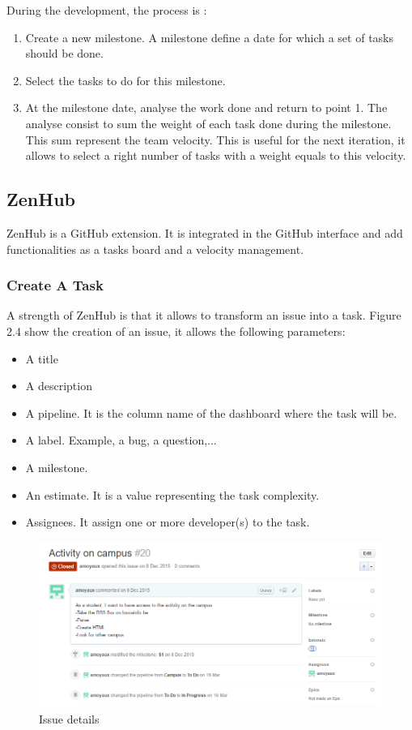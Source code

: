 \documentclass{eplmastersthesis}
\begin{document}
During the development, the process is :

\begin{enumerate}
\item Create a new milestone. A milestone define a date for which a set of tasks should be done.
\item Select the tasks to do for this milestone. 
\item At the milestone date, analyse the work done and return to point 1. The analyse consist to sum the weight of each task done during the milestone. This sum represent the team velocity. This is useful for the next iteration, it allows to select a right number of tasks with a weight equals to this velocity.
\end{enumerate}

\subsection{ZenHub}
ZenHub is a GitHub extension. It is integrated in the GitHub interface and add functionalities as a tasks board and a velocity management.  

\subsubsection{Create A Task}
A strength of ZenHub is that it allows to transform an issue into a task. Figure 2.4 show the creation of an issue, it allows the following parameters:
\begin{itemize}
\item A title
\item A description
\item A pipeline. It is the column name of the dashboard where the task will be.
\item A label. Example, a bug, a question,...
\item A milestone.
\item An estimate. It is a value representing the task complexity.
\item Assignees. It assign one or more developer(s) to the task.
\end{itemize}

\begin{figure}
\centering
\includegraphics[scale = 0.65]{Images/issue.png}
\caption{Issue details}
\end{figure}
\end{document}
